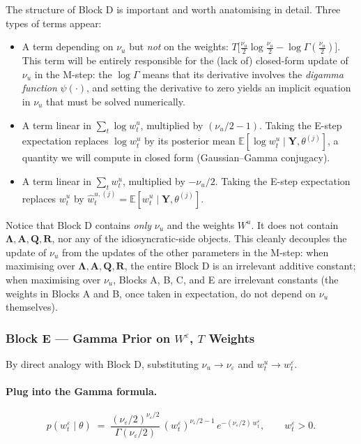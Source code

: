 \documentclass[11pt, a4paper, oneside]{article}
\newcommand{\mY}{\mathbf{Y}}
\newcommand{\mL}{\boldsymbol{\Lambda}}
\newcommand{\mA}{\mathbf{A}}
\newcommand{\mR}{\mathbf{R}}
\newcommand{\mQ}{\mathbf{Q}}
\begin{document}
The structure of Block D is important and worth anatomising in detail.
Three types of terms appear:
\begin{itemize}[leftmargin=1.5em, itemsep=3pt]
    \item A term depending on $\nu_u$ but \emph{not} on the weights:
          $T \big[\tfrac{\nu_u}{2}\log\tfrac{\nu_u}{2} - \log \Gamma(\tfrac{\nu_u}{2})\big]$.
          This term will be entirely responsible for the (lack of)
          closed-form update of $\nu_u$ in the M-step: the
          $\log \Gamma$ means that its derivative involves the
          \emph{digamma function} $\psi(\cdot)$, and setting the
          derivative to zero yields an implicit equation in $\nu_u$
          that must be solved numerically.
    \item A term linear in $\sum_t \log w^u_t$, multiplied by
          $(\nu_u/2 - 1)$. Taking the E-step expectation replaces
          $\log w^u_t$ by its posterior mean
          $\mathbb{E}[\log w^u_t \mid \mY, \theta^{(j)}]$, a quantity
          we will compute in closed form (Gaussian–Gamma conjugacy).
    \item A term linear in $\sum_t w^u_t$, multiplied by $-\nu_u/2$.
          Taking the E-step expectation replaces $w^u_t$ by
          $\hat{w}^{u,(j)}_t = \mathbb{E}[w^u_t \mid \mY, \theta^{(j)}]$.
\end{itemize}
Notice that Block D contains \emph{only} $\nu_u$ and the weights
$W^u$. It does not contain $\mL, \mA, \mQ, \mR$, nor any of the
idiosyncratic-side objects. This cleanly decouples the update of
$\nu_u$ from the updates of the other parameters in the M-step: when
maximising over $\mL, \mA, \mQ, \mR$, the entire Block D is an
irrelevant additive constant; when maximising over $\nu_u$, Blocks A,
B, C, and E are irrelevant constants (the weights in Blocks A and B,
once taken in expectation, do not depend on $\nu_u$ themselves).

\subsubsection*{Block E — Gamma Prior on $W^\varepsilon$, $T$ Weights}

By direct analogy with Block D, substituting $\nu_u \to \nu_\varepsilon$
and $w^u_t \to w^\varepsilon_t$.

\paragraph{Plug into the Gamma formula.}
\[
p(w^\varepsilon_t \mid \theta)
\;=\; \frac{(\nu_\varepsilon/2)^{\nu_\varepsilon/2}}{\Gamma(\nu_\varepsilon/2)}\,
(w^\varepsilon_t)^{\nu_\varepsilon/2 - 1}\, e^{-(\nu_\varepsilon/2)\, w^\varepsilon_t},
\qquad w^\varepsilon_t > 0.
\]
\end{document}

